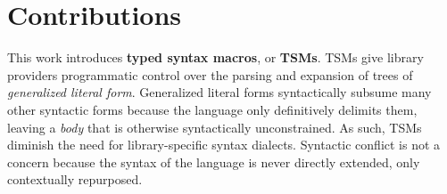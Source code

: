 





\section{Contributions}\label{sec:contributions}
This work introduces \textbf{typed syntax macros}, or \textbf{TSMs}. TSMs give library providers programmatic control over the parsing and expansion of trees of \emph{generalized literal form}. Generalized literal forms syntactically subsume many other syntactic forms because the language only definitively delimits them, leaving a \emph{body} that is otherwise syntactically unconstrained. As such, TSMs diminish the need for library-specific syntax dialects. Syntactic conflict is not a concern because the syntax of the language is never directly extended, only contextually repurposed.

